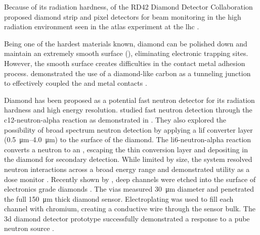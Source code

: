 \documentclass[../../../main.tex]{subfiles}
\begin{document}
    Because of its radiation hardness, \citeauthor*{Wallny_2007} of the RD42 Diamond Detector Collaboration proposed diamond strip and pixel detectors for beam monitoring in the high radiation environment seen in the \gls{atlas} experiment at the \gls{lhc} \cite{Wallny_2007}.
    \par%
    Being one of the hardest materials known, diamond can be polished down and maintain an extremely smooth surface (), eliminating electronic trapping sites.
    However, the smooth surface creates difficulties in the contact metal adhesion process.    
    \citeauthor*{Galbiati_2009} demonstrated the use of a diamond-like carbon as a tunneling junction to effectively coupled the  and  metal contacts \cite{Galbiati_2009}.    
    \par%
    Diamond has been proposed as a potential fast neutron detector for its radiation hardness and high energy resolution.
    \citeauthor*{Pillon_2011} studied fast neutron detection through the \gls{c12-neutron-alpha} reaction as demonstrated in  \cite{Pillon_2011}.
    They also explored the possibility of broad spectrum neutron detection by applying a \gls{lif} converter layer (\SIrange[range-phrase = --]{0.5}{4.0}{\micro\meter}) to the surface of the diamond.
    The \gls{li6-neutron-alpha} reaction converts a neutron to an , escaping the thin conversion layer and depositing in the diamond for secondary detection.
    While limited by size, the system resolved neutron interactions across a broad energy range and demonstrated utility as a dose monitor \cite{Angelone_2011}.
    Recently shown by \citeauthor*{Wulz_2017}, deep channels were etched into the surface of electronics grade diamonds \cite{Wulz_2017}.
    The vias measured \SI{30}{\micro\meter} diameter and penetrated the full \SI{150}{\micro\meter} thick diamond sensor.
    Electroplating was used to fill each channel with chromium, creating a conductive wire through the sensor bulk.
    The \gls{3d} diamond detector prototype successfully demonstrated a response to a \gls{pube} neutron source \cite{thesis:Wulz_2017}.
\end{document}

